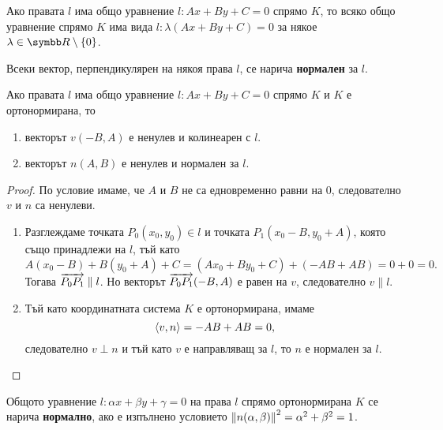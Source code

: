 \documentclass[
  headings=standardclasses,
  bibliography=totocnumbered,
]{scrartcl}
\begin{document}
\begin{corollary}
  Ако правата \( l \) има общо уравнение \( l: Ax + By + C = 0 \) спрямо \( K \), то всяко общо уравнение спрямо \( K \) има вида \( l: \lambda(Ax + By + C) = 0 \) за някое \( \lambda \in \R \setminus \{ 0 \} \).
\end{corollary}

\begin{definition}
  Всеки вектор, перпендикулярен на някоя права \( l \), се нарича \textbf{нормален} за \( l \).
\end{definition}

\begin{proposition}
  Ако правата \( l \) има общо уравнение \( l: Ax + By + C = 0 \) спрямо \( K \) и \( K \) е ортонормирана, то
  \begin{enumerate}
    \item векторът \( v(-B, A) \) е ненулев и колинеарен с \( l \).
    \item векторът \( n(A, B) \) е ненулев и нормален за \( l \).
  \end{enumerate}
\end{proposition}
\begin{proof}
  По условие имаме, че \( A \) и \( B \) не са едновременно равни на \( 0 \), следователно \( v \) и \( n \) са ненулеви.
  \begin{enumerate}
    \item Разглеждаме точката \( P_0(x_0, y_0) \in l \) и точката \( P_1(x_0 - B, y_0 + A) \), която също принадлежи на \( l \), тъй като
    \begin{equation*}
      A(x_0 - B) + B(y_0 + A) + C = (Ax_0 + By_0 + C) + (-AB + AB) = 0 + 0 = 0.
    \end{equation*}
     Тогава \( \overrightarrow{P_0 P_1} \parallel l \). Но векторът \( \overrightarrow{P_0 P_1}(-B, A) \) е равен на \( v \), следователно \( v \parallel l \).

    \item Тъй като координатната система \( K \) е ортонормирана, имаме
    \begin{equation*}
      \left\langle v, n \right\rangle = -AB + AB = 0,
    \end{equation*}
    следователно \( v \perp n \) и тъй като \( v \) е направляващ за \( l \), то \( n \) е нормален за \( l \).
  \end{enumerate}
\end{proof}

\begin{definition}
  Общото уравнение \( l: \alpha x + \beta y + \gamma = 0 \) на права \( l \) спрямо ортонормирана \( K \) се нарича \textbf{нормално}, ако е изпълнено условието \( \left\Vert n(\alpha, \beta) \right\Vert^2 = \alpha^2 + \beta^2 = 1 \).
\end{definition}
\end{document}
